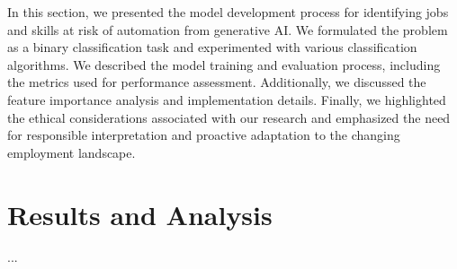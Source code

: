 \documentclass{article}
\begin{document}
In this section, we presented the model development process for identifying jobs and skills at risk of automation from generative AI. We formulated the problem as a binary classification task and experimented with various classification algorithms. We described the model training and evaluation process, including the metrics used for performance assessment. Additionally, we discussed the feature importance analysis and implementation details. Finally, we highlighted the ethical considerations associated with our research and emphasized the need for responsible interpretation and proactive adaptation to the changing employment landscape.

\section{Results and Analysis}
...
\end{document}
